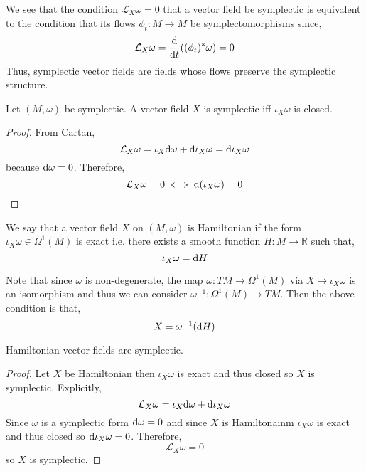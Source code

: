 \documentclass[12pt]{extarticle}
\renewcommand{\L}{\mathcal{L}}
\newcommand{\R}{\mathbb{R}}
\begin{document}
\begin{remark}
We see that the condition $\L_X \omega = 0$ that a vector field be symplectic is equivalent to the condition that its flows $\phi_t :  M \to M$ be symplectomorphisms since,
\[ \L_X \omega = \deriv{}{t} ((\phi_t)^* \omega) = 0 \]
Thus, symplectic vector fields are fields whose flows preserve the symplectic structure.
\end{remark}

\begin{lemma}
Let $(M, \omega)$ be symplectic. A vector field $X$ is symplectic iff $\iota_X \omega$ is closed.
\end{lemma}

\begin{proof}
From Cartan,
\[ \L_X \omega = \iota_X \d{\omega} + \d \iota_X \omega = \d \iota_X \omega \]
because $\mathrm{d}{\omega} = 0$. Therefore,
\[ \L_X \omega = 0 \iff \d{(\iota_X \omega)} = 0 \]
\end{proof}

\begin{definition}
We say that a vector field $X$ on $(M, \omega)$ is Hamiltonian if the form $\iota_X \omega \in \Omega^1(M)$ is exact i.e. there exists a smooth function $H : M \to \R$ such that,
\[ \iota_X \omega = \mathrm{d}{H} \]
\end{definition}

\begin{remark}
Note that since $\omega$ is non-degenerate, the map $\omega : TM \to \Omega^1(M)$ via $X \mapsto \iota_X \omega$ is an isomorphism and thus we can consider $\omega^{-1} : \Omega^1(M) \to TM$. Then the above condition is that,
\[ X = \omega^{-1}(\mathrm{d}{H}) \] 
\end{remark}

\begin{lemma}
Hamiltonian vector fields are symplectic.
\end{lemma}

\begin{proof}
Let $X$ be Hamiltonian then $\iota_X \omega$ is exact and thus closed so $X$ is symplectic. Explicitly,
\[ \L_X \omega = \iota_X \d \omega + \d \iota_X \omega \]
Since $\omega$ is a symplectic form $\mathrm{d}{\omega} = 0$ and since $X$ is Hamiltonainm $\iota_X \omega$ is exact and thus closed so $\mathrm{d} \iota_X \omega = 0$. Therefore,
\[ \L_X \omega = 0 \]
so $X$ is symplectic. 
\end{proof}

\newcommand{\sym}{\mathfrak{sym}}

\newcommand{\ham}{\mathfrak{ham}}
\end{document}
